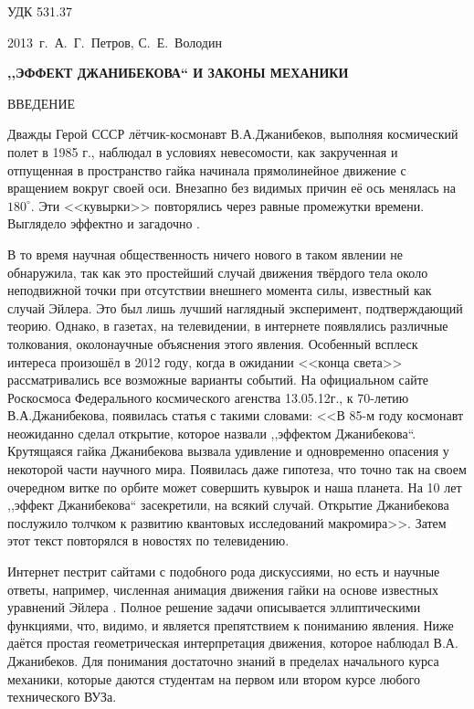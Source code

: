 \documentclass[14pt,a4paper]{extarticle}
\begin{document}
УДК 531.37

\smallskip


\centerline{2013~г.~{А.~Г.~Петров, С.~Е.~Володин}}

\smallskip

\centerline{\bf ,,ЭФФЕКТ ДЖАНИБЕКОВА`` И ЗАКОНЫ МЕХАНИКИ}

\bigskip

ВВЕДЕНИЕ

Дважды Герой СССР лётчик-космонавт В.А.Джанибеков, выполняя космический полет в 1985 г., наблюдал в условиях невесомости, как
закрученная и отпущенная в пространство гайка начинала прямолинейное движение с вращением вокруг
своей оси. Внезапно без видимых причин её ось менялась на $180^\circ$. Эти <<кувырки>> повторялись через
равные промежутки времени. Выглядело эффектно и загадочно \cite{video}.

В то время научная общественность ничего нового в таком явлении не обнаружила, так как это простейший случай движения твёрдого тела около неподвижной точки при отсутствии внешнего момента силы, известный как случай Эйлера. Это был лишь лучший наглядный эксперимент, подтверждающий теорию.
Однако, в газетах, на телевидении, в интернете появлялись различные толкования, околонаучные объяснения этого явления.
Особенный всплеск интереса произошёл в 2012 году, когда в ожидании <<конца света>> рассматривались все возможные варианты событий. На официальном сайте Роскосмоса Федерального космического агенства 13.05.12г., к 70-летию В.А.Джанибекова,  появилась статья \cite{federalspace} с такими словами: <<В 85-м году космонавт неожиданно сделал открытие, которое назвали ,,эффектом Джанибекова``. Крутящаяся гайка Джанибекова вызвала удивление и одновременно опасения у некоторой части научного мира. Появилась даже гипотеза, что точно так на своем очередном витке по орбите может совершить кувырок и наша планета. На 10 лет ,,эффект Джанибекова`` засекретили, на всякий случай. Открытие Джанибекова послужило толчком к развитию квантовых исследований макромира>>. Затем этот текст повторялся в новостях по телевидению.

Интернет пестрит сайтами с подобного рода дискуссиями, но есть и научные ответы, например, численная анимация движения гайки на основе известных уравнений Эйлера
\cite{anim}. Полное решение задачи описывается эллиптическими функциями, что, видимо, и является препятствием к пониманию явления.
Ниже даётся простая геометрическая интерпретация движения, которое наблюдал В.А. Джанибеков. Для понимания достаточно  знаний в пределах начального курса механики, которые даются студентам на первом или втором курсе любого технического ВУЗа.
\end{document}
